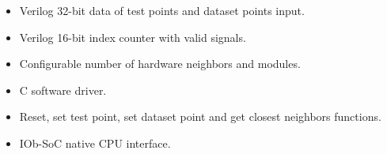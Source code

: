 \begin{itemize}
\item Verilog 32-bit data of test points and dataset points input.
\item Verilog 16-bit index counter with valid signals.
\item Configurable number of hardware neighbors and modules.
\item C software driver.
\item Reset, set test point, set dataset point and get closest neighbors functions.
\item IOb-SoC native CPU interface.
\end{itemize}
